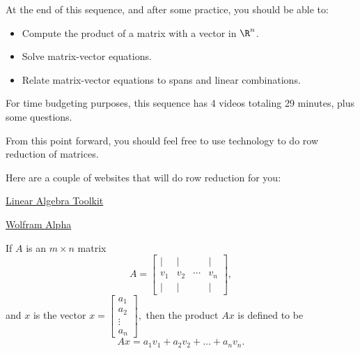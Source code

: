 







At the end of this sequence, and after some practice, you should be able to:

\begin{itemize}
\item Compute the product of a matrix with a vector in $\R^n$.   
\item Solve matrix-vector equations.
\item Relate matrix-vector equations to spans and linear combinations.  
\end{itemize}


For time budgeting purposes, this sequence has 4 videos totaling 29 minutes, 
plus some questions.  




\endedxtext

\endedxvertical



From this point forward, you should feel free to use technology to do row reduction of matrices.  

Here are a couple of websites that will do row reduction for you:

\href{http://www.math.odu.edu/\~bogacki/cgi-bin/lat.cgi}{Linear Algebra Toolkit}

\href{https://www.wolframalpha.com/}{Wolfram Alpha}


\endedxtext

\endedxvertical





If $A$ is an $m\times n$ matrix
\[ A = \left[ \begin{array}{cccc} | & | & & | \\ 
v_1 & v_2 & \cdots & v_n \\
 | & | & & | \end{array} \right], \] and $x$ is the vector $x = \left[\begin{array}{c} a_1 \\ a_2 \\ \vdots \\ a_n
\end{array} \right],$ then 
the product $Ax$ is defined to be 
\[ Ax = a_1 v_1 + a_2 v_2 + \ldots + a_n v_n.\]


